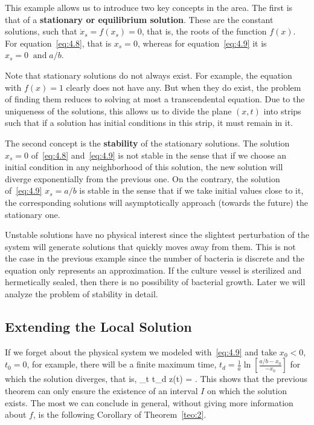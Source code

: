 This example allows us to introduce two key concepts in the area.
The first is that of a {\bf stationary or equilibrium solution}. These are the constant solutions, such that
$\dot x_s=f(x_s)=0$, that is, the roots of the function $f(x)$.
For equation~\ref{eq:4.8}, that is $x_s=0$, whereas for equation~\ref{eq:4.9} it is
$x_s=0\;\;\mbox{and}\;a/b$. 

Note that stationary solutions do not always exist. For example, the equation with $f(x)=1$ clearly does not have any. But when they do exist, the problem of finding them reduces to solving at most a transcendental equation.
Due to the uniqueness of the solutions, this allows us to divide the
plane $(x,t)$ into strips such that if a solution has initial conditions in this strip, it must remain in it.

The second concept is the {\bf stability} of the stationary solutions.
The solution $x_s=0$ of~\ref{eq:4.8} and~\ref{eq:4.9} is not stable in the sense that if we choose an initial condition in any neighborhood of this solution, the new solution will diverge exponentially from the previous one. On the contrary, the solution of~\ref{eq:4.9} $x_s=a/b$ is stable in the sense that if we take initial values close to it, the corresponding solutions will asymptotically approach (towards the future) the stationary one.

Unstable solutions have no physical interest since the slightest perturbation of the system will generate solutions that quickly moves away from them. 
This is not the case in the previous example since the number of bacteria is discrete and the equation only represents an approximation. 
If the culture vessel is sterilized and hermetically sealed, then there is no possibility of bacterial growth.
Later we will analyze the problem of stability in detail.

\subsection{Extending the Local Solution}

If we forget about the physical system we modeled with~\ref{eq:4.9} 
and take
$x_0 < 0$, $t_0 = 0$, for example, there will be a finite maximum time, 
$t_d = \frac1a \ln [\frac{a/b - x_0}{- x_0}]$ for which the solution diverges, that is,
\beq 
\lim_{t \rightarrow t_d} z(t) = \infty . 
\eeq
This shows that the previous theorem can only ensure the
existence of an interval $I$ on which the solution exists. The
most we can conclude in general, without giving more information about $f$, is the following Corollary of
Theorem~\ref{teo:2}.

